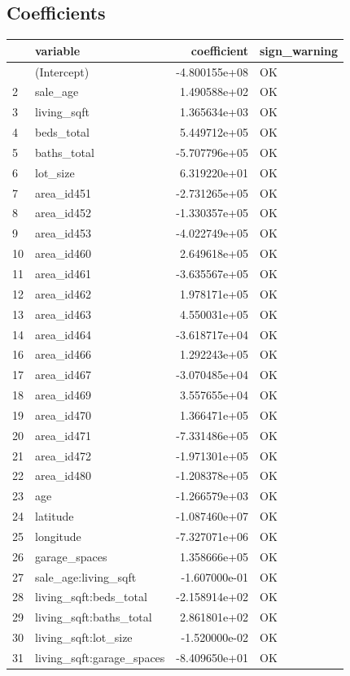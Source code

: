 \documentclass[
]{article}
\begin{document}
\subsection{Coefficients}\label{coefficients}

{\def\LTcaptype{} %
\begin{longtable}[]{@{}llrl@{}}
\toprule\noalign{}
& variable & coefficient & sign\_warning \\
\midrule\noalign{}
\endhead
\bottomrule\noalign{}
\endlastfoot
1 & (Intercept) & -4.800155e+08 & OK \\
2 & sale\_age & 1.490588e+02 & OK \\
3 & living\_sqft & 1.365634e+03 & OK \\
4 & beds\_total & 5.449712e+05 & OK \\
5 & baths\_total & -5.707796e+05 & OK \\
6 & lot\_size & 6.319220e+01 & OK \\
7 & area\_id451 & -2.731265e+05 & OK \\
8 & area\_id452 & -1.330357e+05 & OK \\
9 & area\_id453 & -4.022749e+05 & OK \\
10 & area\_id460 & 2.649618e+05 & OK \\
11 & area\_id461 & -3.635567e+05 & OK \\
12 & area\_id462 & 1.978171e+05 & OK \\
13 & area\_id463 & 4.550031e+05 & OK \\
14 & area\_id464 & -3.618717e+04 & OK \\
16 & area\_id466 & 1.292243e+05 & OK \\
17 & area\_id467 & -3.070485e+04 & OK \\
18 & area\_id469 & 3.557655e+04 & OK \\
19 & area\_id470 & 1.366471e+05 & OK \\
20 & area\_id471 & -7.331486e+05 & OK \\
21 & area\_id472 & -1.971301e+05 & OK \\
22 & area\_id480 & -1.208378e+05 & OK \\
23 & age & -1.266579e+03 & OK \\
24 & latitude & -1.087460e+07 & OK \\
25 & longitude & -7.327071e+06 & OK \\
26 & garage\_spaces & 1.358666e+05 & OK \\
27 & sale\_age:living\_sqft & -1.607000e-01 & OK \\
28 & living\_sqft:beds\_total & -2.158914e+02 & OK \\
29 & living\_sqft:baths\_total & 2.861801e+02 & OK \\
30 & living\_sqft:lot\_size & -1.520000e-02 & OK \\
31 & living\_sqft:garage\_spaces & -8.409650e+01 & OK \\
\end{longtable}
}
\end{document}
